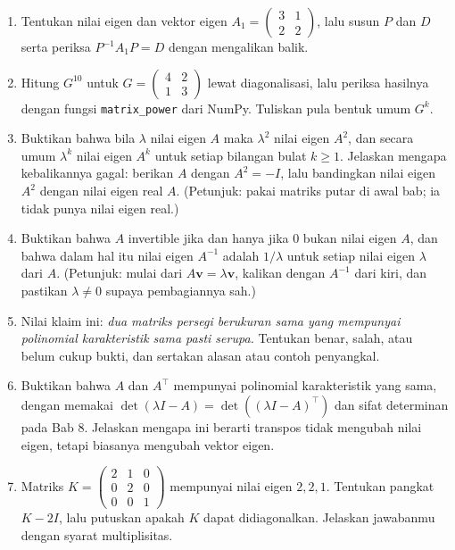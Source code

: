 \begin{latihan}
\begin{enumerate}
  \item Tentukan nilai eigen dan vektor eigen
        $A_{1}=\begin{pmatrix}3&1\\ 2&2\end{pmatrix}$, lalu susun $P$ dan $D$ serta periksa
        $P^{-1}A_{1}P=D$ dengan mengalikan balik.

  \item Hitung $G^{10}$ untuk $G=\begin{pmatrix}4&2\\ 1&3\end{pmatrix}$ lewat diagonalisasi,
        lalu periksa hasilnya dengan fungsi \texttt{matrix\_power} dari NumPy. Tuliskan pula
        bentuk umum $G^{k}$.

  \item Buktikan bahwa bila $\lambda$ nilai eigen $A$ maka $\lambda^{2}$ nilai eigen $A^{2}$,
        dan secara umum $\lambda^{k}$ nilai eigen $A^{k}$ untuk setiap bilangan bulat $k\ge1$.
        Jelaskan mengapa kebalikannya gagal: berikan $A$ dengan $A^{2}=-I$, lalu bandingkan nilai
        eigen $A^{2}$ dengan nilai eigen real $A$.
        (Petunjuk: pakai matriks putar di awal bab; ia tidak punya nilai eigen real.)

  \item Buktikan bahwa $A$ invertible jika dan hanya jika $0$ bukan nilai eigen $A$, dan bahwa
        dalam hal itu nilai eigen $A^{-1}$ adalah $1/\lambda$ untuk setiap nilai eigen $\lambda$
        dari $A$.
        (Petunjuk: mulai dari $A\mathbf{v}=\lambda\mathbf{v}$, kalikan dengan $A^{-1}$ dari kiri,
        dan pastikan $\lambda\neq0$ supaya pembagiannya sah.)

  \item Nilai klaim ini: \emph{dua matriks persegi berukuran sama yang mempunyai polinomial
        karakteristik sama pasti serupa.} Tentukan benar, salah, atau belum cukup bukti, dan
        sertakan alasan atau contoh penyangkal.

  \item Buktikan bahwa $A$ dan $A^{\top}$ mempunyai polinomial karakteristik yang sama, dengan
        memakai $\det(\lambda I-A)=\det((\lambda I-A)^{\top})$ dan sifat determinan pada Bab 8.
        Jelaskan mengapa ini berarti transpos tidak mengubah nilai eigen, tetapi biasanya
        mengubah vektor eigen.

  \item Matriks $K=\begin{pmatrix}2&1&0\\ 0&2&0\\ 0&0&1\end{pmatrix}$ mempunyai nilai eigen
        $2,2,1$. Tentukan pangkat $K-2I$, lalu putuskan apakah $K$ dapat didiagonalkan. Jelaskan
        jawabanmu dengan syarat multiplisitas.


\end{enumerate}
\end{latihan}
